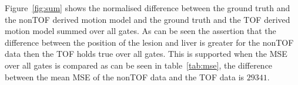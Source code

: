 \documentclass[journal]{IEEEtran}
\begin{document}
Figure~\ref{fig:sum} shows the normalised difference between the ground truth and the nonTOF derived motion model and the ground truth and the TOF derived motion model summed over all gates. As can be seen the assertion that the difference between the position of the lesion and liver is greater for the nonTOF data then the TOF holds true over all gates. This is supported when the MSE over all gates is compared as can be seen in table~\ref{tab:mse}, the difference between the mean MSE of the nonTOF data and the TOF data is $29341$.


%
%

%
%
\end{document}
